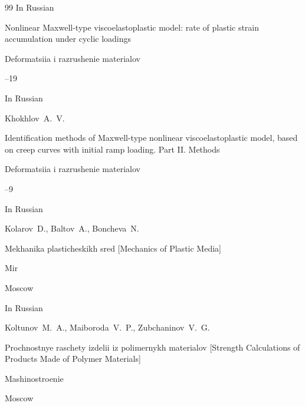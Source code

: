 \begin{thebibliography}{99}
\lang In Russian

\paper Nonlinear Maxwell-type viscoelastoplastic model: rate of plastic strain accumulation under cyclic loadings

\jour Deformatsiia i razrushenie materialov



--19







\lang In Russian

\by Khokhlov~A.~V.

\paper Identification methods of Maxwell-type nonlinear viscoelastoplastic model, based on creep curves with initial ramp loading. Part II. Methods

\jour Deformatsiia i razrushenie materialov



--9








\lang In Russian

\by Kolarov~D., Baltov~A., Boncheva~N.

\book Mekhanika plasticheskikh sred \rm [Mechanics of Plastic Media]


\publ Mir

\publaddr Moscow









\lang In Russian

\by Koltunov~M.~A., Maiboroda~V.~P., Zubchaninov~V.~G.

\book Prochnostnye raschety izdelii iz polimernykh materialov \rm [Strength Calculations of Products Made of Polymer Materials]


\publ Mashinostroenie

\publaddr Moscow











\end{thebibliography}
